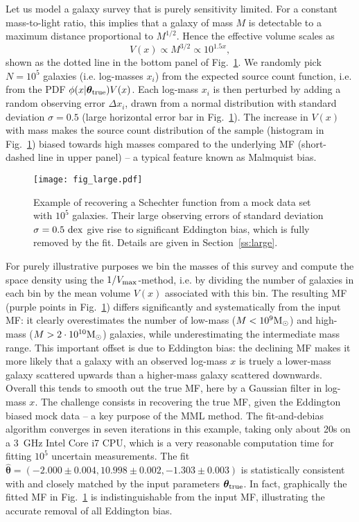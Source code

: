 \documentclass[a4paper,fleqn,usenatbib]{mnras}
\newcommand{\be}{\begin{equation}}
\newcommand{\ee}{\end{equation}}
\newcommand{\msun}{{\rm M}_{\odot}}
\newcommand{\veff}{V}%
\newcommand{\vmax}{V_{\rm max}}
\newcommand{\fig}[1]{Fig.~\ref{fig:#1}}
\renewcommand{\ss}[1]{Section~\ref{ss:#1}}
\newcommand{\ie}{i.e.\xspace}
\newcommand{\para}{{\bm{\theta}}}
\begin{document}
Let us model a galaxy survey that is purely sensitivity limited. For a constant mass-to-light ratio, this implies that a galaxy of mass $M$ is detectable to a maximum distance proportional to $M^{1/2}$. Hence the effective volume scales as
%
\be\label{eq:sensitivitylimit}
	\veff(x) \propto M^{3/2} \propto 10^{1.5x},
\ee
%
shown as the dotted line in the bottom panel of \fig{large}. We randomly pick $N=10^5$ galaxies (\ie log-masses $x_i$) from the expected source count function, \ie from the PDF $\phi(x|\para_{\rm true})\veff(x)$. Each log-mass $x_i$ is then perturbed by adding a random observing error $\Delta x_i$, drawn from a normal distribution with standard deviation $\sigma=0.5$ (large horizontal error bar in \fig{large}). The increase in $\veff(x)$ with mass makes the source count distribution of the sample (histogram in \fig{large}) biased towards high masses compared to the underlying MF (short-dashed line in upper panel) -- a typical feature known as Malmquist bias.

\begin{figure}
\begin{center}
\texttt{[image: fig\_large.pdf]}\vspace{-3mm}
\caption{Example of recovering a Schechter function from a mock data set with $10^5$ galaxies. Their large observing errors of standard deviation $\sigma=0.5~\rm dex$ give rise to significant Eddington bias, which is fully removed by the fit. Details are given in \ss{large}.}\label{fig:large}
\end{center}
\end{figure}

For purely illustrative purposes we bin the masses of this survey and compute the space density using the $1/\vmax$-method, \ie by dividing the number of galaxies in each bin by the mean volume $\veff(x)$ associated with this bin. The resulting MF (purple points in \fig{large}) differs significantly and systematically from the input MF: it clearly overestimates the number of low-mass ($M<10^9\msun$) and high-mass ($M>2\cdot10^{10}\msun$) galaxies, while underestimating the intermediate mass range. This important offset is due to Eddington bias: the declining MF makes it more likely that a galaxy with an observed log-mass $x$ is truely a lower-mass galaxy scattered upwards than a higher-mass galaxy scattered downwards. Overall this tends to smooth out the true MF, here by a Gaussian filter in log-mass $x$.
The challenge consists in recovering the true MF, given the Eddington biased mock data -- a key purpose of the MML method. The fit-and-debias algorithm converges in seven iterations in this example, taking only about 20s on a 3~GHz Intel Core i7 CPU, which is a very reasonable computation time for fitting $10^5$ uncertain measurements. The fit $\hat\para=(-2.000\pm0.004,10.998\pm0.002,-1.303\pm 0.003)$ is statistically consistent with and closely matched by the input parameters $\para_{\rm true}$. In fact, graphically the fitted MF in \fig{large} is indistinguishable from the input MF, illustrating the accurate removal of all Eddington bias.
\end{document}
